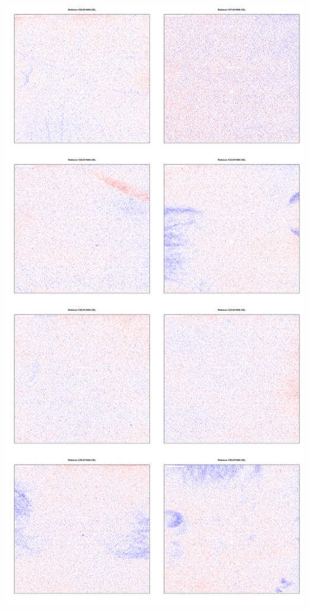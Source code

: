 \documentclass[pdf]{beamer}
\begin{document}
\begin{frame}
\begin{columns}[t]
\begin{column}[T]{5cm}
        \includegraphics[scale=0.1]{figures/resid0.png} 
     \end{column}
  \end{columns}
\end{frame}
\end{document}
